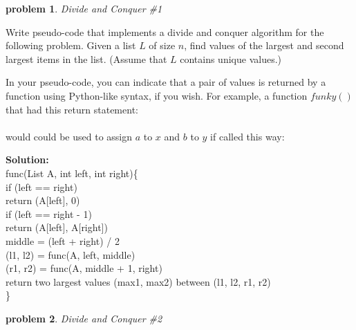 \documentclass[10pt]{article}
\newtheorem{problem}{\sc\color{cit}problem}
\begin{document}
 \begin{problem} Divide and Conquer \#1\end{problem}
    
\noindent
Write pseudo-code that implements a divide and conquer algorithm for the following problem.  Given a list $L$ of size $n$,  find values of the largest and second largest items in the list.  (Assume that $L$ contains unique values.)
	
	In your pseudo-code,  you can indicate that a pair of values is returned by a function using Python-like syntax, if you wish.  For example,  a function $funky()$ that had this return statement:\\
	\hspace*{3em}{\tt return a, b} \\
	would could be used to assign $a$ to $x$ and $b$ to $y$ if called this way: \\
	\hspace*{3em}{\tt (x, y) = funky()}
	
	\textbf{Solution:}  \\
	func(List A, int left, int right)\{\\
	\hspace*{1cm}if (left == right)\\
	\hspace*{2cm}return (A[left], 0)\\
	\hspace*{1cm}if (left == right - 1)\\
	\hspace*{2cm}return (A[left], A[right])\\
	\hspace*{1cm}middle = (left + right) / 2 \\
	\hspace*{1cm}(l1, l2) = func(A, left, middle)\\
	\hspace*{1cm}(r1, r2) = func(A, middle + 1, right)\\
	\hspace*{1cm}return two largest values (max1, max2) between (l1, l2, r1, r2)\\
	\}
	
 \begin{problem} Divide and Conquer \#2\end{problem}
\end{document}
